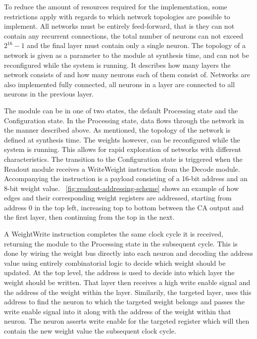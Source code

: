 To reduce the amount of resources required for the implementation, some
restrictions apply with regards to which network topologies are possible to
implement. All networks must be entirely feed-forward, that is they can not
contain any recurrent connections, the total number of neurons can not exceed
$2^{16}-1$ and the final layer must contain only a single neuron. The topology
of a network is given as a parameter to the module at synthesis time, and can
not be reconfigured while the system is running. It describes how many layers
the network consists of and how many neurons each of them consist of. Networks
are also implemented fully connected, all neurons in a layer are connected to
all neurons in the previous layer.

The module can be in one of two states, the default Processing state and the
Configuration state. In the Processing state, data flows through the network in
the manner described above. As mentioned, the topology of the network is defined
at synthesis time. The weights however, can be reconfigured while the system is
running. This allows for rapid exploration of networks with different
characteristics. The transition to the Configuration state is triggered when the
Readout module receives a WriteWeight instruction from the Decode module.
Accompanying the instruction is a payload consisting of a 16-bit address and an
8-bit weight value. \figurename~\ref{fig:readout-addressing-scheme} shows an
example of how edges and their corresponding weight registers are addressed,
starting from address 0 in the top left, increasing top to bottom between the CA
output and the first layer, then continuing from the top in the next.

A WeightWrite instruction completes the same clock cycle it is received,
returning the module to the Processing state in the subsequent cycle. This is
done by wiring the weight bus directly into each neuron and decoding the address
value using entirely combinatorial logic to decide which weight should be
updated. At the top level, the address is used to decide into which layer the
weight should be written. That layer then receives a high write enable signal
and the address of the weight within the layer. Similarily, the targeted layer,
uses this address to find the neuron to which the targeted weight belongs and
passes the write enable signal into it along with the address of the weight
within that neuron. The neuron asserts write enable for the targeted register
which will then contain the new weight value the subsequent clock cycle.


